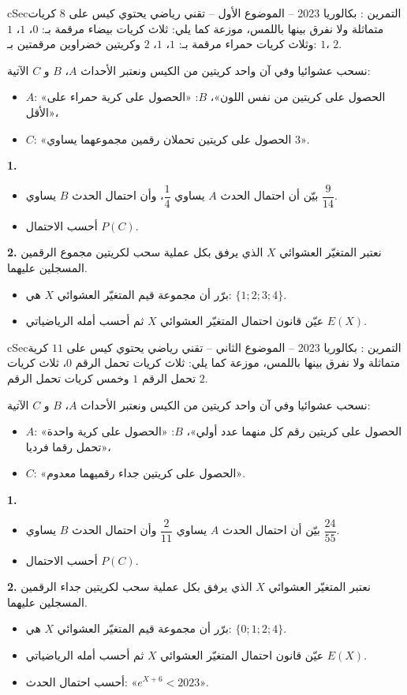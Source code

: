 \documentclass[12pt,a4paper]{article}
\newenvironment{BOX}[2]{\begin{otherlanguage}{english}\begin{arbox}{#1}{#2}}{\end{arbox}\end{otherlanguage}}
\newcounter{exo}
\newenvironment{tamrin}[1]{\stepcounter{exo}\begin{BOX}{cSec}{التمرين \theexo: #1}}{\end{BOX}}
\newenvironment{sq}{\begin{itemize}[leftmargin=2.4em,itemsep=3pt]}{\end{itemize}}
\newcommand{\qa}{\item[(أ)]}\newcommand{\qb}{\item[(ب)]}\newcommand{\qc}{\item[(جـ)]}\newcommand{\qd}{\item[(د)]}\newcommand{\qe}{\item[(هـ)]}
\newcommand{\QQ}[1]{\par\smallskip\textbf{#1.} }
\begin{document}
\begin{tamrin}{بكالوريا 2023 -- الموضوع الأول -- تقني رياضي}
يحتوي كيس على $8$ كريات متماثلة ولا نفرق بينها باللمس، موزعة كما يلي: ثلاث كريات بيضاء مرقمة بـ: $0$، $1$، $1$ وثلاث كريات حمراء مرقمة بـ: $1$، $1$، $2$ وكريتين خضراوين مرقمتين بـ: $1$، $2$.

نسحب عشوائيا وفي آن واحد كريتين من الكيس ونعتبر الأحداث $A$، $B$ و $C$ الآتية:
\begin{itemize}
\item $A$: «الحصول على كريتين من نفس اللون»، \quad $B$: «الحصول على كرية حمراء على الأقل»،
\item $C$: «الحصول على كريتين تحملان رقمين مجموعهما يساوي $3$».
\end{itemize}
\QQ{1}
\begin{sq}
\qa بيّن أن احتمال الحدث $A$ يساوي $\dfrac{1}{4}$، وأن احتمال الحدث $B$ يساوي $\dfrac{9}{14}$.
\qb أحسب الاحتمال $P(C)$.
\end{sq}
\QQ{2} نعتبر المتغيّر العشوائي $X$ الذي يرفق بكل عملية سحب لكريتين مجموع الرقمين المسجلين عليهما.
\begin{sq}
\qa برّر أن مجموعة قيم المتغيّر العشوائي $X$ هي: $\{1;2;3;4\}$.
\qb عيّن قانون احتمال المتغيّر العشوائي $X$ ثم أحسب أمله الرياضياتي $E(X)$.
\end{sq}
\end{tamrin}

\begin{tamrin}{بكالوريا 2023 -- الموضوع الثاني -- تقني رياضي}
يحتوي كيس على $11$ كرية متماثلة ولا نفرق بينها باللمس، موزعة كما يلي: ثلاث كريات تحمل الرقم $0$، ثلاث كريات تحمل الرقم $1$ وخمس كريات تحمل الرقم $2$.

نسحب عشوائيا وفي آن واحد كريتين من الكيس ونعتبر الأحداث $A$، $B$ و $C$ الآتية:
\begin{itemize}
\item $A$: «الحصول على كريتين رقم كل منهما عدد أولي»، \quad $B$: «الحصول على كرية واحدة تحمل رقما فرديا»،
\item $C$: «الحصول على كريتين جداء رقميهما معدوم».
\end{itemize}
\QQ{1}
\begin{sq}
\qa بيّن أن احتمال الحدث $A$ يساوي $\dfrac{2}{11}$ وأن احتمال الحدث $B$ يساوي $\dfrac{24}{55}$.
\qb أحسب الاحتمال $P(C)$.
\end{sq}
\QQ{2} نعتبر المتغيّر العشوائي $X$ الذي يرفق بكل عملية سحب لكريتين جداء الرقمين المسجلين عليهما.
\begin{sq}
\qa برّر أن مجموعة قيم المتغيّر العشوائي $X$ هي: $\{0;1;2;4\}$.
\qb عيّن قانون احتمال المتغيّر العشوائي $X$ ثم أحسب أمله الرياضياتي $E(X)$.
\qc أحسب احتمال الحدث: «$e^{X+6}<2023$».
\end{sq}
\end{tamrin}
\end{document}
